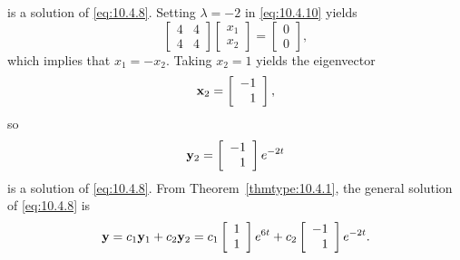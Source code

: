 \begin{examplesolution}
\[\]
is a solution of \eqref{eq:10.4.8}. Setting $\lambda=-2$ in \eqref{eq:10.4.10} yields
\[
  \left[
  \begin{array}{rr}
    4 & 4 \\
    4 & 4
  \end{array}\right] \left[
  \begin{array}{c}
    x_{1} \\
    x_{2}
  \end{array}\right]=\left[
  \begin{array}{c}
    0 \\
    0
  \end{array}\right],
\]
which implies that $x_{1}=-x_{2}$. Taking $x_{2}=1$ yields the eigenvector
\[
  {\bf x}_{2}=\left[
  \begin{array}{r}
    -1 \\
    1
  \end{array}\right],
\]
so
\[
  {\bf y}_{2}=\left[
  \begin{array}{r}
    -1 \\
    1
  \end{array}
  \right]e^{-2t}
\]
is a solution of \eqref{eq:10.4.8}. From Theorem~\ref{thmtype:10.4.1}, the general solution of
\eqref{eq:10.4.8} is
\begin{equation}
  \label{eq:10.4.11}{\bf y}=c_{1}{\bf y}_{1}+c_{2}{\bf y}_{2}=c_{1}\left[
  \begin{array}{r}
    1 \\
    1
  \end{array}\right]e^{6t}+c_{2}\left[
  \begin{array}{r}
    -1 \\
    1
  \end{array}\right]e^{-2t}.
\end{equation}


\end{examplesolution}
